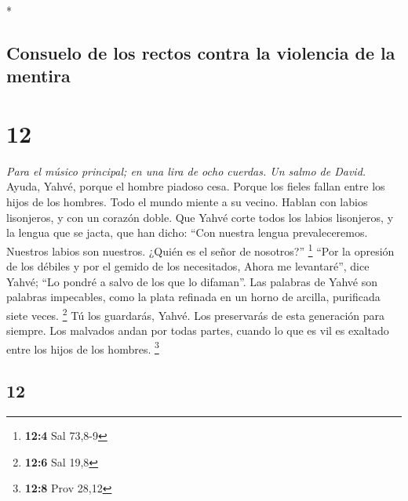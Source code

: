 \begin{paracol}{2}
\begin{otherlanguage}{english}
\end{otherlanguage}

\switchcolumn[0]*

\hypertarget{consuelo-de-los-rectos-contra-la-violencia-de-la-mentira}{%
\subsection{Consuelo de los rectos contra la violencia de la
mentira}\label{consuelo-de-los-rectos-contra-la-violencia-de-la-mentira}}

\hypertarget{section-22}{%
\section{12}\label{section-22}}

\emph{Para el músico principal; en una lira de ocho cuerdas. Un salmo de
David.}\\
 Ayuda, Yahvé, porque el hombre piadoso cesa. Porque los
fieles fallan entre los hijos de los hombres.  Todo el
mundo miente a su vecino. Hablan con labios lisonjeros, y con un corazón
doble.  Que Yahvé corte todos los labios lisonjeros, y la
lengua que se jacta,  que han dicho: ``Con nuestra lengua
prevaleceremos. Nuestros labios son nuestros. ¿Quién es el señor de
nosotros?'' \footnote{\textbf{12:4} Sal 73,8-9}  ``Por la
opresión de los débiles y por el gemido de los necesitados, Ahora me
levantaré'', dice Yahvé; ``Lo pondré a salvo de los que lo difaman''.
 Las palabras de Yahvé son palabras impecables, como la
plata refinada en un horno de arcilla, purificada siete veces.
\footnote{\textbf{12:6} Sal 19,8}  Tú los guardarás,
Yahvé. Los preservarás de esta generación para siempre. 
Los malvados andan por todas partes, cuando lo que es vil es exaltado
entre los hijos de los hombres. \footnote{\textbf{12:8} Prov 28,12}

\switchcolumn
\begin{otherlanguage}{english}

\hypertarget{section-23}{%
\section{12}\label{section-23}}


\end{otherlanguage}
\end{paracol}
